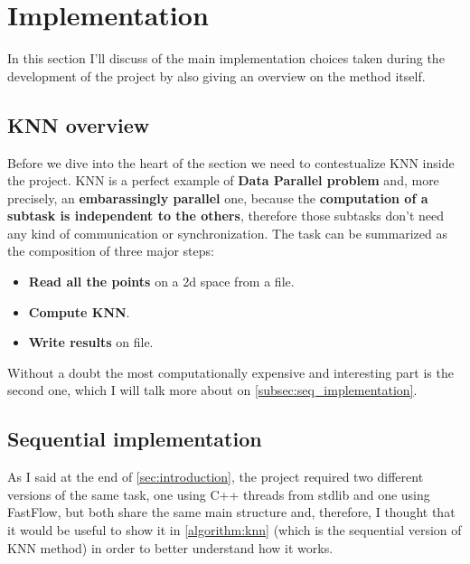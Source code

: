 \section{Implementation}
In this section I'll discuss of the main implementation choices taken during the development of the project by also giving an overview on the method itself.

\subsection{KNN overview}\label{subsec:knn_overview}
Before we dive into the heart of the section we need to contestualize KNN inside the project. KNN is a perfect example of \textbf{Data Parallel problem} and, more precisely, an \textbf{embarassingly parallel} one, because the \textbf{computation of a subtask is independent to the others}, therefore those subtasks don't need any kind of communication or synchronization.
The task can be summarized as the composition of three major steps:
\begin{itemize}
    \item \textbf{Read all the points} on a 2d space from a file.
    \item\textbf{Compute KNN}.
    \item \textbf{Write results} on file.
\end{itemize}
Without a doubt the most computationally expensive and interesting part is the second one, which I will talk more about on \autoref{subsec:seq_implementation}.

\subsection{Sequential implementation}\label{subsec:seq_implementation}
As I said at the end of \autoref{sec:introduction}, the project required two different versions of the same task, one using C++ threads from stdlib and one using FastFlow, but both share the same main structure and, therefore, I thought that it would be useful to show it in \autoref{algorithm:knn} (which is the sequential version of KNN method) in order to better understand how it works.

